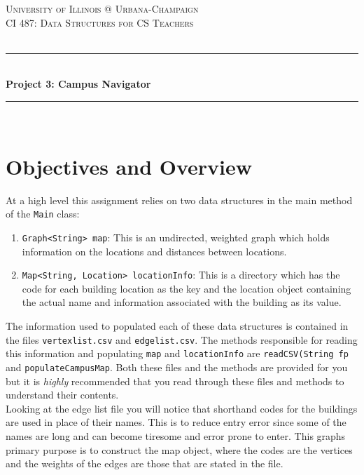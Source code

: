 \documentclass[a4paper]{article}
\begin{document}
\begin{titlepage}

\newcommand{\HRule}{\rule{\linewidth}{0.5mm}} 							%
\center 
 
\textsc{\LARGE University of Illinois @ Urbana-Champaign}\\[1cm]

\textsc{\Large CI 487: Data Structures for CS Teachers}\\[0.2cm]
\textsc{\large }\\[1cm] 										%
\HRule \\[0.8cm]
{ \huge \bfseries Project 3: Campus Navigator}\\[0.7cm]								%
\HRule \\[0.8cm]
\vfill

\vfill 

\end{titlepage}


\section*{Objectives and Overview}

At a high level this assignment relies on two data structures in the main
method of the \lstinline|Main| class:
\begin{enumerate}
    \item \lstinline|Graph<String> map|: This is an undirected, weighted graph which holds information on the locations and distances between locations.
    \item \lstinline|Map<String, Location> locationInfo|: This is a directory which has the code for each building location as the key and the location object containing the actual name and information associated with the building as its value.
\end{enumerate}

The information used to populated each of these data structures is contained in
the files \texttt{vertexlist.csv} and \texttt{edgelist.csv}. The methods responsible
for reading this information and populating \lstinline|map| and \lstinline|locationInfo|
are \lstinline|readCSV(String fp| and \lstinline|populateCampusMap|. Both these
files and the methods are provided for you but it is \textit{highly} recommended that you
read through these files and methods to understand their contents.\\

Looking at the edge list file you will notice that shorthand codes for the
buildings are used in place of their names. This is to reduce entry error since
some of the names are long and can become tiresome and error prone to enter.
This graphs primary purpose is to construct the map object, where the codes are
the vertices and the weights of the edges are those that are stated in the
file.\\
\end{document}
